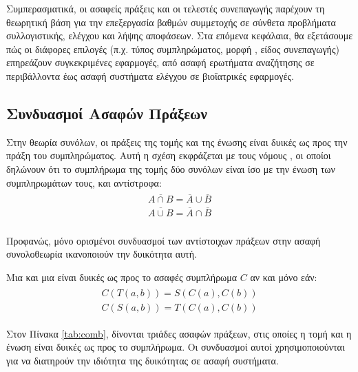 \noindent
Συμπερασματικά, οι ασαφείς πράξεις και οι τελεστές συνεπαγωγής παρέχουν τη θεωρητική βάση για την επεξεργασία βαθμών συμμετοχής σε σύνθετα προβλήματα συλλογιστικής, ελέγχου και λήψης αποφάσεων. Στα επόμενα κεφάλαια, θα εξετάσουμε πώς οι διάφορες επιλογές (π.χ. τύπος συμπληρώματος, μορφή , είδος συνεπαγωγής) επηρεάζουν συγκεκριμένες εφαρμογές, από ασαφή ερωτήματα αναζήτησης σε περιβάλλοντα  έως ασαφή συστήματα ελέγχου σε βιοϊατρικές εφαρμογές.
\subsection{Συνδυασμοί Ασαφών Πράξεων}

Στην θεωρία συνόλων, οι πράξεις της τομής και της ένωσης είναι δυικές ως προς την πράξη του συμπληρώματος. Αυτή η σχέση εκφράζεται με τους νόμους , οι οποίοι δηλώνουν ότι το συμπλήρωμα της τομής δύο συνόλων είναι ίσο με την ένωση των συμπληρωμάτων τους, και αντίστροφα:
\begin{align}
\begin{split}
    \overline{A \cap B} = \overline{A} \cup \overline{B} \\
    \overline{A \cup B} = \overline{A} \cap \overline{B} \\
\end{split}
\end{align}

Προφανώς, μόνο ορισμένοι συνδυασμοί των αντίστοιχων πράξεων στην ασαφή συνολοθεωρία ικανοποιούν την δυικότητα αυτή.
\begin{definition}
Μια  και μια  είναι δυικές ως προς το ασαφές συμπλήρωμα \(C\) αν και μόνο εάν:
\begin{align}
\begin{split}
C(T(a,b)) = S(C(a),C(b)) \\
C(S(a,b)) = T(C(a),C(b))
\end{split}
\end{align}
\end{definition}

Στον Πίνακα \ref{tab:comb}, δίνονται τριάδες ασαφών πράξεων, στις οποίες η τομή και η ένωση είναι δυικές ως προς το συμπλήρωμα. Οι συνδυασμοί αυτοί χρησιμοποιούνται για να διατηρούν την ιδιότητα της δυικότητας σε ασαφή συστήματα.

